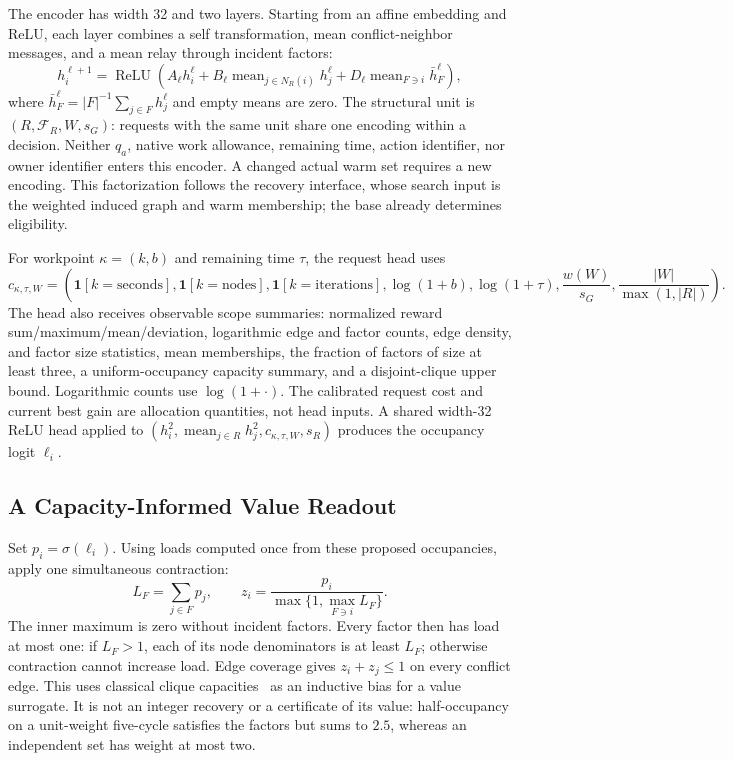 The encoder has width 32 and two layers. Starting from an affine embedding
and ReLU, each layer combines a self transformation, mean conflict-neighbor
messages, and a mean relay through incident factors:
\begin{equation}
 h_i^{\ell+1}=\operatorname{ReLU}\!\left(
 A_\ell h_i^\ell+
 B_\ell\operatorname{mean}_{j\in N_R(i)}h_j^\ell+
 D_\ell\operatorname{mean}_{F\ni i}\bar h_F^\ell\right),
 \label{eq:v4-encoder}
\end{equation}
where $\bar h_F^\ell=|F|^{-1}\sum_{j\in F}h_j^\ell$ and empty means are
zero. The structural unit is $(R,\mathcal F_R,W,s_G)$: requests with the
same unit share one encoding within a decision. Neither $q_a$, native work
allowance, remaining time, action identifier, nor owner identifier enters
this encoder. A changed actual warm set requires a new encoding. This
factorization follows the recovery interface, whose search input is the
weighted induced graph and warm membership; the base already determines
eligibility.

For workpoint $\kappa=(k,b)$ and remaining time $\tau$, the request head uses
\begin{equation}
 c_{\kappa,\tau,W}=\left(
 \mathbf1[k=\mathrm{seconds}],\mathbf1[k=\mathrm{nodes}],
 \mathbf1[k=\mathrm{iterations}],\log(1+b),\log(1+\tau),
 \frac{w(W)}{s_G},\frac{|W|}{\max(1,|R|)}\right).
 \label{eq:v4-head-context}
\end{equation}
The head also receives observable scope summaries: normalized reward
sum/maximum/mean/deviation, logarithmic edge and factor counts, edge density,
and factor size
statistics, mean memberships, the fraction of factors of size at least
three, a uniform-occupancy capacity summary, and a disjoint-clique upper
bound. Logarithmic counts use $\log(1+\cdot)$. The calibrated
request cost and current best gain are allocation quantities, not head
inputs. A shared width-32 ReLU head applied to
$(h_i^2,\operatorname{mean}_{j\in R}h_j^2,c_{\kappa,\tau,W},s_R)$ produces
the occupancy logit $\ell_i$.

\subsection{A Capacity-Informed Value Readout}
\label{sec:v4-capacity}
Set $p_i=\sigma(\ell_i)$. Using loads computed once from these proposed
occupancies, apply one simultaneous contraction:
\begin{equation}
 L_F=\sum_{j\in F}p_j,\qquad
 z_i=\frac{p_i}{\max\{1,\max_{F\ni i}L_F\}}.
 \label{eq:v4-capacity}
\end{equation}
The inner maximum is zero without incident factors. Every factor then has
load at most one: if $L_F>1$, each of its node denominators is at least
$L_F$; otherwise contraction cannot increase load. Edge coverage gives
$z_i+z_j\leq1$ on every conflict edge. This uses classical clique
capacities~\cite{chvatal1975polytopes} as an inductive bias for a value
surrogate. It is not an integer recovery or a certificate of its value:
half-occupancy on a unit-weight five-cycle satisfies the factors but sums
to $2.5$, whereas an independent set has weight at most two.


